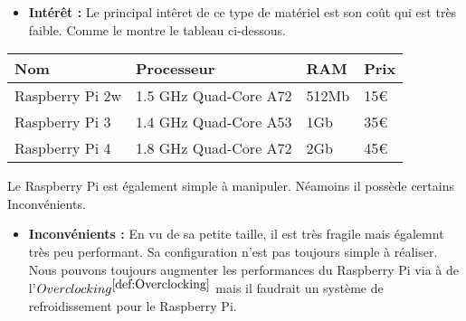         \vspace{0.2cm}

        \begin{flushleft}
            \begin{itemize}
                \item \textbf{Intérêt :}
                Le principal intêret de ce type de matériel est son coût qui est très faible. Comme le montre le tableau ci-dessous.
            \end{itemize}                       

            \begin{center}
                \begin{tabular}{ |p{3cm}|p{3cm}|p{3cm}|p{3cm}|  }
                    \hline
                    Nom & Processeur & RAM & Prix\\
                    \hline
                    Raspberry Pi 2w & 1.5 GHz Quad-Core A72 & 512Mb & 15€\\
                    \hline
                    Raspberry Pi 3 & 1.4 GHz Quad-Core A53 & 1Gb & 35€\\
                    \hline
                    Raspberry Pi 4 & 1.8 GHz Quad-Core A72 & 2Gb & 45€\\
                    \hline
                \end{tabular}            
            \end{center}

            Le Raspberry Pi est également simple à manipuler. Néamoins il possède certains Inconvénients.

            \begin{center}
                \begin{itemize}
                    \item \textbf{Inconvénients :}
                    En vu de sa petite taille, il est très fragile mais égalemnt très peu performant.
                    Sa configuration n'est pas toujours simple à réaliser.
                    Nous pouvons toujours augmenter les performances du Raspberry Pi via à de l'\underline{$ Overclocking^{\ref{def:Overclocking}}$} mais il faudrait un système de refroidissement pour le Raspberry Pi.
                \end{itemize}
            \end{center}



        \end{flushleft}     
            
